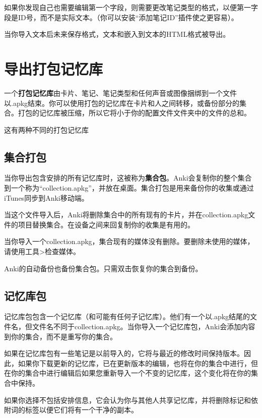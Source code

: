 \documentclass[a4paper]{book}
\begin{document}
			如果你发现自己也需要编辑第一个字段，则需要更改笔记类型的格式，以便第一字段是ID号，而不是实际文本。（你可以安装“添加笔记ID”插件使之更容易）。
			
			当你导入文本后未来保存格式，文本和嵌入到文本的HTML格式被导出。
			\section{导出打包记忆库}
			
			一个\textbf{打包记忆库}由卡片、笔记、笔记类型和任何声音或图像捆绑到一个文件以.apkg结束。你可以使用打包的记忆库在卡片和人之间转移，或备份部分的集合。打包的记忆库被压缩，所以它将小于你的配置文件文件夹中的文件的总和。
			
			这有两种不同的打包记忆库
			
			\subsection{集合打包}
			当你导出包含安排的所有记忆库时，这被称为\textbf{集合包}。Anki会复制你的整个集合到一个称为“collection.apkg”，并放在桌面。集合打包是用来备份你的收集或通过iTunes同步到Anki移动端。
			
			当这个文件导入后，Anki将删除集合中的所有现有的卡片，并在collection.apkg文件的项目替换集合。在设备之间来回复制你的收集是有用的。
			
			
			\begin{shaded}
				当你导入一个collection.apkg，集合现有的媒体没有删除。要删除未使用的媒体，请使用工具>检查媒体。
			\end{shaded}
			
			\begin{shaded}
				Anki的自动备份也备份集合包。只需双击恢复你的集合到备份。
			\end{shaded}
			
			
			\subsection{记忆库包}
			记忆库包包含一个记忆库（和可能有任何子记忆库）。他们有一个以.apkg结尾的文件名，但文件名不同于collection.apkg。当你导入一个记忆库包，Anki会添加内容到你的集合，而不是重写你的集合。
			
			如果在记忆库包有一些笔记是以前导入的，它将与最近的修改时间保持版本。因此，如果你下载更新的记忆库，已在更新版本的编辑，也将在你的集合中进行，但在你的集合中进行编辑后如果您重新导入一个不变的记忆库，这个变化将在你的集合中保持。
			
			如果你选择不包括安排信息，它会认为你与其他人共享记忆库，并将删除标记和依附词的标签以便它们将有一个干净的副本。
			
\end{document}
